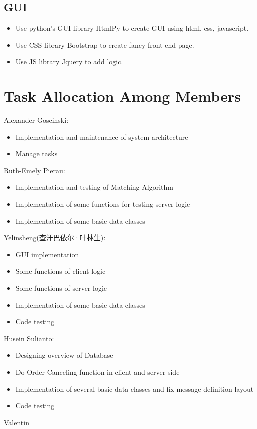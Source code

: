 \documentclass[a4paper, 11pt]{article}
\begin{document}
\subsection*{GUI}
\begin{itemize}
  \item Use python's GUI library HtmlPy to create GUI using html, css, javascript.
  \item Use CSS library Bootstrap to create fancy front end page. 
  \item Use JS library Jquery to add logic.
\end{itemize}




\section*{Task Allocation Among Members}

Alexander Goscinski:
\begin{itemize}
  \item Implementation and maintenance of system architecture
  \item Manage tasks
\end{itemize}
Ruth-Emely Pierau:
\begin{itemize}
	\item Implementation and testing of Matching Algorithm
	\item Implementation of some functions for testing server logic
	\item Implementation of some basic data classes
\end{itemize}
Yelinsheng(查汗巴依尔·叶林生):
\begin{itemize}
  \item GUI implementation
  \item Some functions of client logic
  \item Some functions of server logic
  \item Implementation of some basic data classes
  \item Code testing
\end{itemize}
Husein Sulianto:
\begin{itemize}
  \item Designing overview of Database
  \item Do Order Canceling function in client and server side
  \item Implementation of several basic data classes and fix message definition layout
  \item Code testing
\end{itemize}
Valentin
\end{document}
